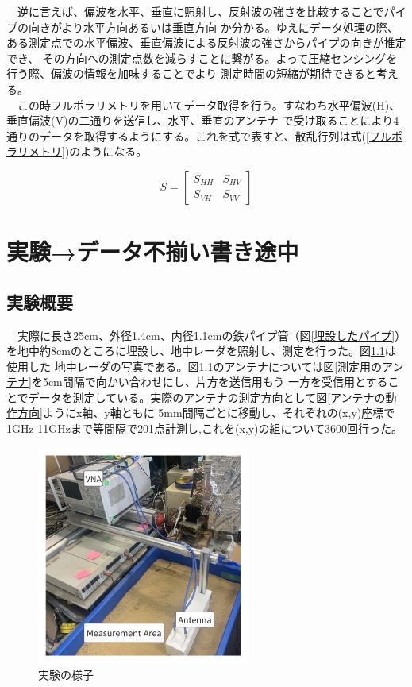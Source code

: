 \documentclass[12pt,a4paper]{jsreport}
\begin{document}
　逆に言えば、偏波を水平、垂直に照射し、反射波の強さを比較することでパイプの向きがより水平方向あるいは垂直方向
か分かる。ゆえにデータ処理の際、ある測定点での水平偏波、垂直偏波による反射波の強さからパイプの向きが推定でき、
その方向への測定点数を減らすことに繋がる。よって圧縮センシングを行う際、偏波の情報を加味することでより
測定時間の短縮が期待できると考える。
\\　この時フルポラリメトリを用いてデータ取得を行う。すなわち水平偏波(H)、垂直偏波(V)の二通りを送信し、水平、垂直のアンテナ
で受け取ることにより4通りのデータを取得するようにする。これを式で表すと、散乱行列は式(\ref{フルポラリメトリ})のようになる。

\begin{equation}
  S =
      \left[
      \begin{array}{rrr}
      S_{HH} & S_{HV}  \\
      S_{VH} & S_{VV} 
      
      \end{array}
      \right]\label{フルポラリメトリ}
  \end{equation}


\chapter{実験→データ不揃い書き途中}
\section{実験概要}
　実際に長さ25cm、外径1.4cm、内径1.1cmの鉄パイプ管（図\ref{埋設したパイプ}）を地中約8cmのところに埋設し、地中レーダを照射し、測定を行った。図\ref{実験の様子}は使用した
地中レーダの写真である。図\ref{実験の様子}のアンテナについては図\ref{測定用のアンテナ}を5cm間隔で向かい合わせにし、片方を送信用もう
一方を受信用とすることでデータを測定している。実際のアンテナの測定方向として図\ref{アンテナの動作方向}ようにx軸、y軸ともに
5mm間隔ごとに移動し、それぞれの(x,y)座標で1GHz-11GHzまで等間隔で201点計測し,これを(x,y)の組について3600回行った。

\begin{figure}[h]
  \begin{center}
   \includegraphics[width=7cm]{./image/Exp_Situ.pdf}
  \caption{実験の様子}\label{実験の様子}
  \end{center}
  \end{figure}
\end{document}

